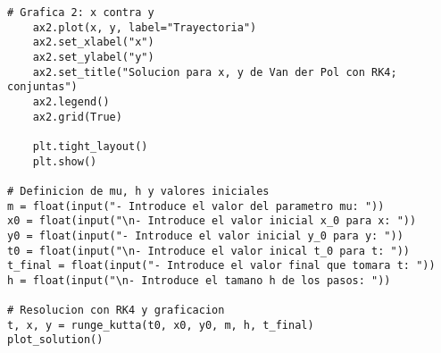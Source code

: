\begin{lstlisting}[style=python]
    # Grafica 2: x contra y
    ax2.plot(x, y, label="Trayectoria")
    ax2.set_xlabel("x")
    ax2.set_ylabel("y")
    ax2.set_title("Solucion para x, y de Van der Pol con RK4; conjuntas")
    ax2.legend()
    ax2.grid(True)

    plt.tight_layout()
    plt.show()

# Definicion de mu, h y valores iniciales
m = float(input("- Introduce el valor del parametro mu: "))
x0 = float(input("\n- Introduce el valor inicial x_0 para x: "))
y0 = float(input("- Introduce el valor inicial y_0 para y: "))
t0 = float(input("\n- Introduce el valor inical t_0 para t: "))
t_final = float(input("- Introduce el valor final que tomara t: "))
h = float(input("\n- Introduce el tamano h de los pasos: "))

# Resolucion con RK4 y graficacion
t, x, y = runge_kutta(t0, x0, y0, m, h, t_final)
plot_solution()
\end{lstlisting}
